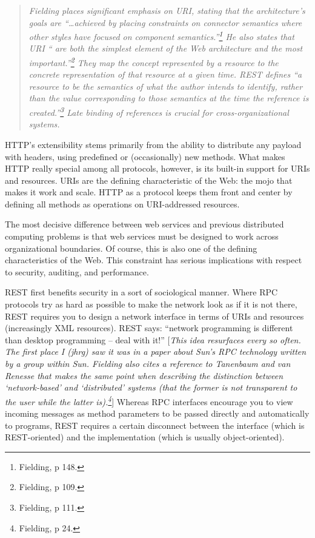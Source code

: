 \documentclass[justify]{dods-paper}
\begin{document}
\begin{quote}
  \emph{Fielding places significant emphasis on URI, stating that the
    architecture's goals are ``\ldots achieved by placing constraints
    on connector semantics where other styles have focused on
    component semantics.''\footnote{Fielding, p 148.} He also states that
    URI `` are both the simplest element of the Web architecture and
    the most important.''\footnote{Fielding, p 109.} They map the concept
    represented by a resource to the concrete representation of that
    resource at a given time. REST defines ``a resource to be the
    semantics of what the author intends to identify, rather than the
    value corresponding to those semantics at the time the reference
    is created.''\footnote{Fielding, p 111.} Late binding of
    references is crucial for cross-organizational systems.}
\end{quote}

HTTP's extensibility stems primarily from the ability to distribute
any payload with headers, using predefined or (occasionally) new
methods. What makes HTTP really special among all protocols, however,
is its built-in support for URIs and resources. URIs are the defining
characteristic of the Web: the mojo that makes it work and scale. HTTP
as a protocol keeps them front and center by defining all methods as
operations on URI-addressed resources. 

The most decisive difference between web services and previous
distributed computing problems is that web services must be designed
to work across organizational boundaries. Of course, this is also one
of the defining characteristics of the Web. This constraint has
serious implications with respect to security, auditing, and
performance.

REST first benefits security in a sort of sociological manner. Where
RPC protocols try as hard as possible to make the network look as if
it is not there, REST requires you to design a network interface in
terms of URIs and resources (increasingly XML resources). REST says:
``network programming is different than desktop programming -- deal
with it!'' [\emph{This idea resurfaces every so often. The first place
  I (jhrg) saw it was in a paper about Sun's RPC technology written by a
  group within Sun.\cite{waldo:dist-comp} Fielding also cites a
  reference to Tanenbaum and van Renesse that makes the same point
  when describing the distinction between `network-based' and
  `distributed' systems (that the former is not transparent to the
  user while the latter is).\footnote{Fielding, p 24.}}]
Whereas RPC interfaces
encourage you to view incoming messages as method parameters to be
passed directly and automatically to programs, REST requires a certain
disconnect between the interface (which is REST-oriented) and the
implementation (which is usually object-oriented).
\end{document}
